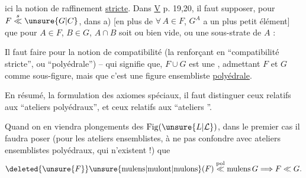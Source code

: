 ici la notion de raffinement \uline{stricte}. Dans  \uline{V} p. 19,20, il faut supposer, pour $F\overset{s}{\ll}\unsure{G|C}$, dans a)  [en plus de $\forall\,A\in F$, $G^A$ a un plus petit élément] que pour $A\in F$, $B\in G$, $A\cap B$ soit ou bien vide, ou une  sous-strate de $A$ :
   

Il faut faire     pour la notion de compatibilité (la renforçant en ``compatibilité stricte'', ou ``polyédrale'') -- qui signifie que,  $F\cup G$ est une  , admettant $F$ et $G$ comme sous-figure, mais que c'est une figure ensembliste \uline{polyédrale}.

En résumé,  la formulation des axiomes spéciaux, il faut distinguer ceux relatifs aux ``ateliers polyédraux'', et ceux relatifs aux ``ateliers ''.

Quand on en viendra  plongements des $\mathrm{Fig}(\unsure{L|\mathcal{L}})$, dans le premier cas il faudra poser (pour les ateliers  ensemblistes, à ne pas confondre avec ateliers ensemblistes polyédraux, qui n'existent  !)
que
\[
\deleted{\unsure{F}}\unsure{\mathrm{mulens}|\mathrm{mulont}|\mathrm{mulons}}(F)
\overset{\mathrm{pol}}{\ll}\mathrm{mulens}\,G\Longrightarrow F\ll G.
\]
